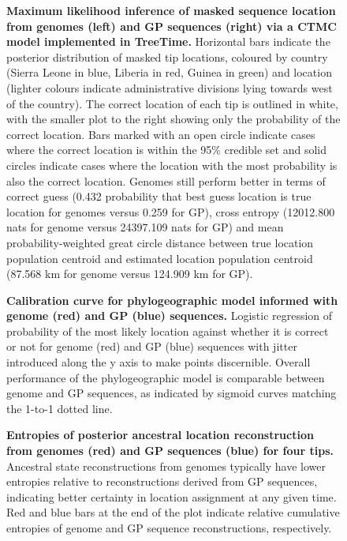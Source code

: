 \documentclass{bmcart}
\def\texttt{[image: ]}
\begin{document}
\begin{figure}[h]
 \centering
	\caption{\textbf{Maximum likelihood inference of masked sequence location from genomes (left) and GP sequences (right) via a CTMC model implemented in TreeTime.}
  Horizontal bars indicate the posterior distribution of masked tip locations, coloured by country (Sierra Leone in blue, Liberia in red, Guinea in green) and location (lighter colours indicate administrative divisions lying towards west of the country).
  The correct location of each tip is outlined in white, with the smaller plot to the right showing only the probability of the correct location.
  Bars marked with an open circle indicate cases where the correct location is within the 95\% credible set and solid circles indicate cases where the location with the most probability is also the correct location.
  Genomes still perform better in terms of correct guess (0.432 probability that best guess location is true location for genomes versus 0.259 for GP), cross entropy (12012.800 nats for genome versus 24397.109 nats for GP) and mean probability-weighted great circle distance between true location population centroid and estimated location population centroid (87.568 km for genome versus 124.909 km for GP).
	}
	\label{TTlocations}
\end{figure}

\begin{figure}[h]
 \centering
	\caption{\textbf{Calibration curve for phylogeographic model informed with genome (red) and GP (blue) sequences.}
  Logistic regression of probability of the most likely location against whether it is correct or not for genome (red) and GP (blue) sequences with jitter introduced along the y axis to make points discernible.
  Overall performance of the phylogeographic model is comparable between genome and GP sequences, as indicated by sigmoid curves matching the 1-to-1 dotted line.
	}
	\label{calibration}
\end{figure}

\begin{figure}[h]
 \centering
  \caption{\textbf{Entropies of posterior ancestral location reconstruction from genomes (red) and GP sequences (blue) for four tips.}
  Ancestral state reconstructions from genomes typically have lower entropies relative to reconstructions derived from GP sequences, indicating better certainty in location assignment at any given time.
  Red and blue bars at the end of the plot indicate relative cumulative entropies of genome and GP sequence reconstructions, respectively.
  }
	\label{trace_entropy}
\end{figure}
\end{document}
